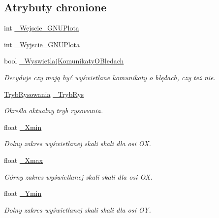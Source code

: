 \subsection*{Atrybuty chronione}
\begin{DoxyCompactItemize}
\item 
int \mbox{\hyperlink{class_pz_g_1_1_lacze_do_g_n_u_plota_adc3a2250216c2473a61da379da70b2d7}{\+\_\+\+Wejscie\+\_\+\+G\+N\+U\+Plota}}
\item 
int \mbox{\hyperlink{class_pz_g_1_1_lacze_do_g_n_u_plota_a7d05a4767a35ee494d59724bb740dbc2}{\+\_\+\+Wyjscie\+\_\+\+G\+N\+U\+Plota}}
\item 
bool \mbox{\hyperlink{class_pz_g_1_1_lacze_do_g_n_u_plota_a2f2800f14ebfe1caef0b4d30c410a7fe}{\+\_\+\+Wyswietlaj\+Komunikaty\+O\+Bledach}}
\begin{DoxyCompactList}\small\item\em Decyduje czy mają być wyświetlane komunikaty o błędach, czy też nie. \end{DoxyCompactList}\item 
\mbox{\hyperlink{namespace_pz_g_aeedae1ef10c66d720f9e89de408ca4ca}{Tryb\+Rysowania}} \mbox{\hyperlink{class_pz_g_1_1_lacze_do_g_n_u_plota_a00e3a51bb47d3fb26eee875dc48215db}{\+\_\+\+Tryb\+Rys}}
\begin{DoxyCompactList}\small\item\em Określa aktualny tryb rysowania. \end{DoxyCompactList}\item 
float \mbox{\hyperlink{class_pz_g_1_1_lacze_do_g_n_u_plota_a69d530edfe769e38448972e897456deb}{\+\_\+\+Xmin}}
\begin{DoxyCompactList}\small\item\em Dolny zakres wyświetlanej skali skali dla osi {\itshape OX}. \end{DoxyCompactList}\item 
float \mbox{\hyperlink{class_pz_g_1_1_lacze_do_g_n_u_plota_a847e00678a413ab076ccbcb7eba3ae58}{\+\_\+\+Xmax}}
\begin{DoxyCompactList}\small\item\em Górny zakres wyświetlanej skali skali dla osi {\itshape OX}. \end{DoxyCompactList}\item 
float \mbox{\hyperlink{class_pz_g_1_1_lacze_do_g_n_u_plota_abc555fd6b82b0d5c9efb4802b58dc317}{\+\_\+\+Ymin}}
\begin{DoxyCompactList}\small\item\em Dolny zakres wyświetlanej skali skali dla osi {\itshape OY}. \end{DoxyCompactList}\item 

\end{DoxyCompactItemize}
